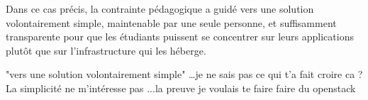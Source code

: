 \documentclass{rapportClass} %
\begin{document}
\smallskip
Dans ce cas précis, la contrainte pédagogique a guidé vers une
solution volontairement simple, maintenable par une seule personne,
et suffisamment transparente pour que les étudiants puissent se
concentrer sur leurs applications plutôt que sur l'infrastructure
qui les héberge.

\smallskip
{\color{red}
  \begin{Large}
  "vers une solution volontairement simple" \ldots je ne sais pas ce qui t'a fait croire ca ?
  La simplicité ne m'intéresse pas ...la preuve je voulais te faire faire du openstack 
\end{Large}
}



\end{document}

